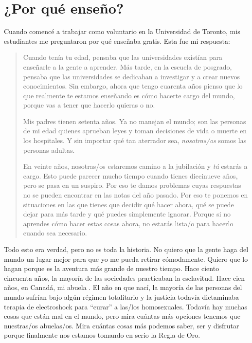 \chapter{¿Por qué enseño?}\label{s:finale}

Cuando comencé a trabajar como voluntario en la Universidad de Toronto,
mis estudiantes me preguntaron por qué enseñaba gratis.
Esta fue mi respuesta:

\begin{quote}

Cuando tenía tu edad,
pensaba que las universidades existían para enseñarle a la gente a aprender.
Más tarde,
en la escuela de posgrado,
pensaba que las universidades se dedicaban a investigar y a crear nuevos conocimientos.
Sin embargo, ahora que tengo cuarenta años
pienso que lo que realmente te estamos enseñando es
cómo hacerte cargo del mundo,
porque vas a tener que hacerlo quieras o no.

Mis padres tienen setenta años.
Ya no manejan el mundo;
son las personas de mi edad quienes aprueban leyes
y toman decisiones de vida o muerte en los hospitales.
Y sin importar qué tan aterrador sea,
\emph{nosotras/os} somos las personas adultas.

En veinte años,
nosotras/os estaremos camino a la jubilación y \emph{tú} estarás a cargo.
Esto puede parecer mucho tiempo cuando tienes diecinueve años,
pero se pasa en un suspiro.
Por eso te damos problemas cuyas respuestas no se pueden encontrar en las notas del año pasado.
Por eso te ponemos en situaciones en las que 
tienes que decidir qué hacer ahora, 
qué se puede dejar para más tarde
y qué puedes simplemente ignorar.
Porque si no aprendes cómo hacer estas cosas ahora,
no estarás lista/o para hacerlo cuando sea necesario.

\end{quote}

Todo esto era verdad,
pero no es toda la historia.
No quiero que la gente haga del mundo un lugar mejor para que yo me pueda retirar cómodamente.
Quiero que lo hagan porque es la aventura más grande de nuestro tiempo.
Hace ciento cincuenta años,
la mayoría de las sociedades practicaban la esclavitud.
Hace cien años, en Canadá,
mi abuela .
El año en que nací,
la mayoría de las personas del mundo sufrían bajo algún régimen totalitario
y la justicia todavía dictaminaba terapia de electroshock para ``curar'' a las/los homosexuales.
Todavía hay muchas cosas que están mal en el mundo,
pero mira cuántas más opciones tenemos que nuestras/os abuelas/os. 
Mira cuántas cosas más podemos saber, ser y disfrutar
porque finalmente nos estamos tomando en serio la Regla de Oro.

